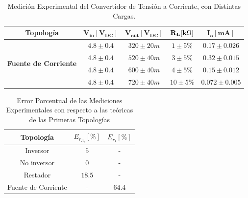     \begin{table}[H]
      \centering
      \begin{tabular}{|c|c|c|c|c|}
        \hline
        \textbf{Topología} & $\mathbf{V_{in} [V_{DC}]}$ & $\mathbf{V_{out} [V_{DC}]}$ & $\mathbf{R_L [k \ohm]}$ & $\mathbf{I_o [m A]}$ \\
        \hline
        \multirow{4}{5cm}{\centering \textbf{Fuente de Corriente}} & $4.8 \pm 0.4$ & $320 \pm 20 m$ & $1 \pm 5\%$ & $0.17 \pm 0.026$ \\
        & $4.8 \pm 0.4$ & $520 \pm 40m $ & $3 \pm 5\%$ & $0.32 \pm 0.015$ \\
        & $4.8 \pm 0.4$ & $600 \pm 40m $ & $4 \pm 5\%$ & $0.15 \pm 0.012 $ \\
        & $4.8 \pm 0.4$ & $ 720 \pm 40m $ & $10 \pm 5\%$ & $0.072 \pm 0.005$ \\
        \hline
      \end{tabular}
      \caption{Medición Experimental del Convertidor de Tensión a Corriente, con Distintas Cargas.}
      \label{tab:resultado12}
    \end{table}


    \begin{table}[H]
      \centering
      \begin{tabular}{|c| c| c|}
        \hline
          \textbf{Topología} & $E_{r_{A_v}} [\%]$ & $E_{r_{I}} [\%]$ \\\hline
        Inversor  & $5$ & - \\\hline
        No inversor &  $0$ & - \\\hline
        Restador  &  $18.5$ & - \\\hline
        Fuente de Corriente  &  - & $64.4$ \\\hline
      \end{tabular}
      \caption{Error Porcentual de las Mediciones Experimentales con respecto a las teóricas de las Primeras Topologías}
      \label{tab:desviacion_resultados1}
    \end{table}
